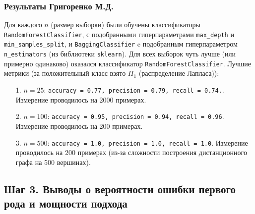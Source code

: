 \documentclass[a4paper,12pt]{article}
\begin{document}
\subsubsection*{Результаты Григоренко М.Д.}
Для каждого $n$ (размер выборки) были обучены классификаторы \texttt{RandomForestClassifier}, с подобранными гиперпараметрами \texttt{max\_depth} и \texttt{min\_samples\_split}, и \texttt{BaggingClassifier} c подобранным гиперпараметром \texttt{n\_estimators} (из библиотеки \texttt{sklearn}). Для всех выборок чуть лучше (или примерно одинаково) оказался классификатор \texttt{RandomForestClassifier}. Лучшие метрики (за положительный класс взято $H_1$ (распределение Лапласа)):
\begin{itemize}
    \item[1.] $n = 25$: \texttt{accuracy = 0.77, precision = 0.79, recall = 0.74.}. Измерение проводилось на 2000 примерах.
    \item[2.] $n = 100$: \texttt{accuracy = 0.95, precision = 0.94, recall = 0.96}. Измерение проводилось на 200 примерах.
    \item[3.] $n = 500$: \texttt{accuracy = 1.0, precision = 1.0, recall = 1.0}. Измерение проводилось на 200 примерах (из-за сложности построения дистанционного графа на 500 вершинах).
\end{itemize}

\subsection{Шаг 3. Выводы о вероятности ошибки первого рода и мощности подхода}
\end{document}

